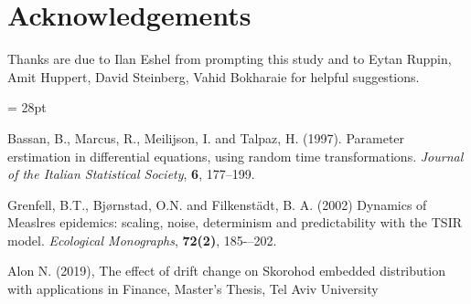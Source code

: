 \documentclass[notes]{beamer}
\begin{document}
\section*{Acknowledgements}
\begin{frame}
Thanks are due to Ilan Eshel from prompting this study and to Eytan Ruppin, Amit Huppert, David Steinberg, Vahid Bokharaie for helpful suggestions.

\baselineskip= 28pt

\begin{thebibliography}{99}

 Bassan, B., Marcus, R., Meilijson, I. and Talpaz, H. (1997). Parameter erstimation in differential equations, using random time transformations. {\em Journal of the Italian Statistical Society}, {\bf 6}, 177--199.

 Grenfell, B.T., Bj{\o}rnstad, O.N. and Filkenst\"{a}dt, B. A. (2002) Dynamics of Measlres epidemics: scaling, noise, determinism and predictability with the TSIR model. {\em Ecological Monographs}, {\bf 72(2)}, 185-–202.

 Alon N. (2019), The effect of drift change on Skorohod embedded distribution with applications in Finance, Master's Thesis, Tel Aviv University
	
\end{thebibliography}
\end{frame}
\end{document}

